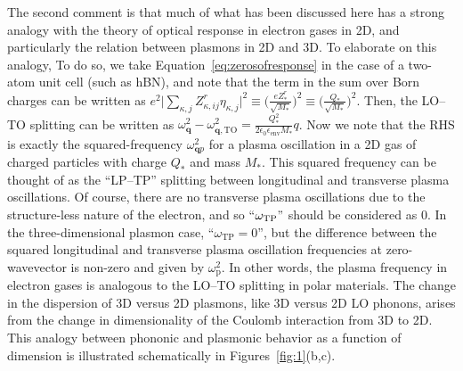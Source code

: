 \documentclass[aps,prb,twocolumn,
	           groupedaddress,superscriptaddress,
               amsfonts,amssymb,amsmath,floatfix,
	           citeautoscript]{revtex4-1}
\begin{document}
The second comment is that much of what has been discussed here has a strong analogy with the theory of optical response in electron gases in 2D, and particularly the relation between plasmons in 2D and 3D. To elaborate on this analogy, To do so, we take Equation~\eqref{eq:zerosofresponse} in the case of a two-atom unit cell (such as hBN), and note that the term in the sum over Born charges can be written as $e^2\big|\sum_{\kappa,j}Z^r_{\kappa,ij}\eta_{\kappa,j}  \big|^2 \equiv  \Big(\frac{eZ^r_*}{\sqrt{M_*}}\Big)^2 \equiv \Big(\frac{Q_*}{\sqrt{M_*}}\Big)^2$. Then, the LO--TO splitting can be written as $\omega^2_{\mathbf{q}} - \omega^2_{\mathbf{q},\mathrm{TO}} = \frac{Q_*^2}{2\epsilon_0\epsilon_{\mathrm{env}} M_*}q$. Now we note that the RHS is exactly the squared-frequency $\omega^2_{\mathbf{q}p}$ for a plasma oscillation in a 2D gas of charged particles with charge $Q_*$ and mass $M_*$. This squared frequency can be thought of as the ``LP--TP'' splitting between longitudinal and transverse plasma oscillations. Of course, there are no transverse plasma oscillations due to the structure-less nature of the electron, and so ``$\omega_{\mathrm{TP}}"$  should be considered as 0. In the three-dimensional plasmon case, ``$\omega_{\mathrm{TP}} = 0$'', but the difference between the squared longitudinal and transverse plasma oscillation frequencies at zero-wavevector is non-zero and given by $\omega_{\mathrm{p}}^2$. In other words, the plasma frequency in electron gases is analogous to the LO--TO splitting in polar materials. The change in the dispersion of 3D versus 2D plasmons, like 3D versus 2D LO phonons, arises from the change in dimensionality of the Coulomb interaction from 3D to 2D.  This analogy between phononic and plasmonic behavior as a function of dimension is illustrated schematically in Figures~\ref{fig:1}(b,c).
  
\end{document}
